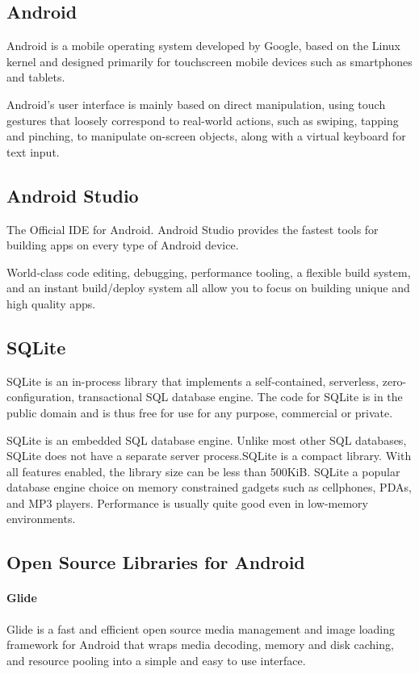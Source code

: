 \documentclass[BTech]{srmuthesis}
\begin{document}
\subsection{Android}
Android is a mobile operating system developed by Google, based on the Linux kernel and designed primarily for touchscreen mobile devices such as smartphones and tablets.

Android's user interface is mainly based on direct manipulation, using touch gestures that loosely correspond to real-world actions, such as swiping, tapping and pinching, to manipulate on-screen objects, along with a virtual keyboard for text input. 
\subsection{Android Studio}
The Official IDE for Android. Android Studio provides the fastest tools for building apps on every type of Android device.

World-class code editing, debugging, performance tooling, a flexible build system, and an instant build/deploy system all allow you to focus on building unique and high quality apps.
\subsection{SQLite}
SQLite is an in-process library that implements a self-contained, serverless, zero-configuration, transactional SQL database engine. The code for SQLite is in the public domain and is thus free for use for any purpose, commercial or private.

SQLite is an embedded SQL database engine. Unlike most other SQL databases, SQLite does not have a separate server process.SQLite is a compact library. With all features enabled, the library size can be less than 500KiB. SQLite a popular database engine choice on memory constrained gadgets such as cellphones, PDAs, and MP3 players. Performance is usually quite good even in low-memory environments.

\subsection{Open Source Libraries for Android}
\paragraph{Glide}
Glide is a fast and efficient open source media management and image loading framework for Android that wraps media decoding, memory and disk caching, and resource pooling into a simple and easy to use interface.
\end{document}
